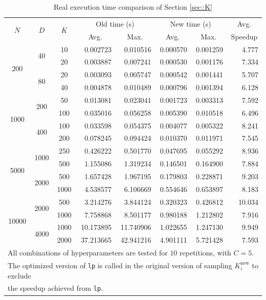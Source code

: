 \documentclass{article}
\begin{document}
\begin{table}[!h]
  \centering
  \small
  \caption{Real execution time comparison of Section \ref{sec::K}}
  \label{tbl::realtime2}
  \begin{tabular}{cccrrrrr}
    \toprule
      \multirow{2}{*}{$N$} & \multirow{2}{*}{$D$} & \multirow{2}{*}{$K$} & \multicolumn{2}{c}{Old time (s)} & \multicolumn{2}{c}{New time (s)} & \multicolumn{1}{c}{Avg.} \\ \cmidrule(lr){4-5} \cmidrule(lr){6-7}
      & & & \multicolumn{1}{c}{Avg.} & \multicolumn{1}{c}{Max.} & \multicolumn{1}{c}{Avg.} & \multicolumn{1}{c}{Max.} & \multicolumn{1}{c}{Speedup} \\
    \midrule
    \multirow{4}{*}{200} & \multirow{2}{*}{40} & 10 & 0.002723 & 0.010516 & 0.000570 & 0.001259 & 4.777
    \\
    & & 20 & 0.003887 & 0.007241 & 0.000530 & 0.001176 & 7.334
    \\
    & \multirow{2}{*}{80} & 20 & 0.003093 & 0.005747 & 0.000542 & 0.001441 & 5.707
    \\
    & & 40 & 0.004878 & 0.010489 & 0.000796 & 0.001394 & 6.128
    \\
    \multirow{4}{*}{1000} & \multirow{2}{*}{200} & 50 & 0.013081 & 0.023041 & 0.001723 & 0.003313 & 7.592
    \\
    & & 100 & 0.035016 & 0.056258 & 0.005390 & 0.010518 & 6.496
    \\
    & \multirow{2}{*}{400} & 100 & 0.033598 & 0.054375 & 0.004077 & 0.005322 & 8.241
    \\
    & & 200 & 0.078245 & 0.094424 & 0.010370 & 0.011971 & 7.545
    \\
    \multirow{4}{*}{5000} & \multirow{2}{*}{1000} & 250 & 0.426222 & 0.501770 & 0.047695 & 0.055292 & 8.936
    \\
    & & 500 & 1.155086 & 1.319234 & 0.146501 & 0.164900 & 7.884
    \\
    & \multirow{2}{*}{2000} & 500 & 1.657428 & 1.967195 & 0.179803 & 0.228871 & 9.203
    \\
    & & 1000 & 4.538577 & 6.106669 & 0.554646 & 0.653897 & 8.183
    \\
    \multirow{4}{*}{10000} & \multirow{2}{*}{2000} & 500 & 3.214276 & 3.844124 & 0.320323 & 0.426812 & 10.034
    \\
    & & 1000 & 7.758868 & 8.501177 & 0.980188 & 1.212802 & 7.916
    \\
    & \multirow{2}{*}{4000} & 1000 & 10.173895 & 11.740906 & 1.022655 & 1.247130 & 9.949
    \\
    & & 2000 & 37.213665 & 42.941216 & 4.901111 & 5.721428 & 7.593 
    \\
    \bottomrule
    \multicolumn{8}{l}{All combinations of hyperparameters are tested for $10$ repetitions, with $C = 5$.} \\
    \multicolumn{8}{l}{The optimized version of \texttt{lp} is called in the original version of sampling $K_i^\text{new}$ to exclude} \\
    \multicolumn{8}{l}{the speedup achieved from \texttt{lp}.}
  \end{tabular}
\end{table}
\end{document}
